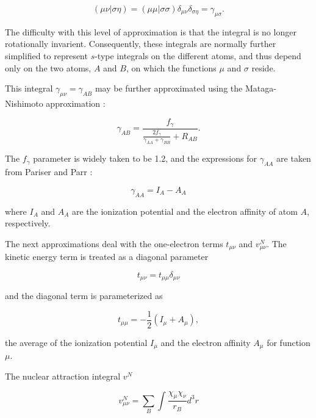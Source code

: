 \begin{equation}
	(\mu\nu|\sigma\eta) 
		= (\mu\mu|\sigma\sigma)\delta_{\mu\nu}\delta_{\sigma\eta}
		= \gamma_{\mu\sigma}.
\end{equation}

\noindent The difficulty with this level of approximation is that the
integral is no longer rotationally invarient. Consequently, these
integrals are normally further simplified to represent $s$-type
integrals on the different atoms, and thus depend only on the two
atoms, $A$ and $B$, on which the functions $\mu$ and $\sigma$ reside.

This integral $\gamma_{\mu\nu} = \gamma_{AB}$ may be further
approximated using the Mataga-Nishimoto approximation
\cite{Mataga57, Zerner80}:

\begin{equation}
	\gamma_{AB} = \frac{f_\gamma}
		{\frac{2f_\gamma}{\gamma_{AA}+\gamma_{BB}} + R_{AB}}.
\label{mataga-nishimoto}
\end{equation}

\noindent The $f_\gamma$ parameter is widely \cite{Zerner80} taken to
be 1.2, and the expressions for $\gamma_{AA}$ are taken from Pariser
and Parr \cite{Pariser53}:

\begin{equation}
	\gamma_{AA} = I_A - A_A
\end{equation}

\noindent where $I_A$ and $A_A$ are the ionization potential and the
electron affinity of atom $A$, respectively.

The next approximations deal with the one-electron terms $t_{\mu\nu}$
and $v^N_{\mu\nu}$. The kinetic energy term is treated as a diagonal
parameter

\begin{equation}
	t_{\mu\nu} = t_{\mu\mu}\delta_{\mu\nu}
\end{equation}

\noindent and the diagonal term is parameterized as

\begin{equation}
	t_{\mu\mu} = -\frac{1}{2}(I_\mu + A_\mu),
\end{equation}

\noindent the average of the ionization potential $I_\mu$ and the
electron affinity $A_\mu$ for function $\mu$.

The nuclear attraction integral $v^N$ 

\begin{equation}
	v^N_{\mu\nu} = \sum_B \int \frac{\chi_\mu \chi_\nu}{r_B}d^3r
\end{equation}

